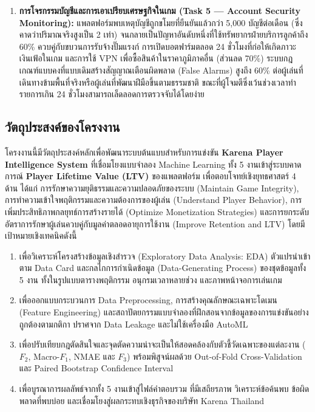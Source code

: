 \documentclass[11pt,a4paper]{article}
\DeclareRobustCommand{\code}[1]{\leavevmode{\ttfamily\color{KeyGreen!85!black}\let\codeunderscore\_\def\_{\codeunderscore\allowbreak}\hyphenpenalty=50\exhyphenpenalty=50\relax#1}}
\begin{document}
\begin{enumerate}[leftmargin=1.9em,itemsep=2.5pt]
    \item \textbf{การโจรกรรมบัญชีและการเอาเปรียบเศรษฐกิจในเกม (Task 5 — Account Security Monitoring):} แพลตฟอร์มพบเหตุบัญชีถูกขโมยที่ยืนยันแล้วกว่า 5,000 บัญชีต่อเดือน (ซึ่งคาดว่าปริมาณจริงสูงเป็น 2 เท่า) จนกลายเป็นปัญหาอันดับหนึ่งที่ใช้ทรัพยากรฝ่ายบริการลูกค้าถึง 60\% ควบคู่กับขบวนการรับจ้างปั๊มแรงก์ การเปิดบอตฟาร์มตลอด 24 ชั่วโมงที่ก่อให้เกิดภาวะเงินเฟ้อในเกม และการใช้ VPN เพื่อซื้อสินค้าในราคาภูมิภาคอื่น (ส่วนลด 70\%) ระบบกฎเกณฑ์แบบคงที่แบบเดิมสร้างสัญญาณเตือนผิดพลาด (False Alarms) สูงถึง 60\% ต่อผู้เล่นที่เดินทางข้ามพื้นที่จริงหรือผู้เล่นที่พัฒนาฝีมือขึ้นตามธรรมชาติ ขณะที่ผู้โจมตีซึ่งเว้นช่วงเวลาทำรายการเกิน 24 ชั่วโมงสามารถเล็ดลอดการตรวจจับได้โดยง่าย
\end{enumerate}

\subsection{วัตถุประสงค์ของโครงงาน}

โครงงานนี้มีวัตถุประสงค์หลักเพื่อพัฒนาระบบต้นแบบสำหรับการแข่งขัน \textbf{Karena Player Intelligence System} ที่เชื่อมโยงแบบจำลอง Machine Learning ทั้ง 5 งานเข้าสู่ระบบคาดการณ์ \textbf{Player Lifetime Value (LTV)} ของแพลตฟอร์ม เพื่อตอบโจทย์เชิงยุทธศาสตร์ 4 ด้าน ได้แก่ การรักษาความยุติธรรมและความปลอดภัยของระบบ (Maintain Game Integrity), การทำความเข้าใจพฤติกรรมและความต้องการของผู้เล่น (Understand Player Behavior), การเพิ่มประสิทธิภาพกลยุทธ์การสร้างรายได้ (Optimize Monetization Strategies) และการยกระดับอัตราการรักษาผู้เล่นควบคู่กับมูลค่าตลอดอายุการใช้งาน (Improve Retention and LTV) โดยมีเป้าหมายเชิงเทคนิคดังนี้

\begin{enumerate}[leftmargin=1.8em,itemsep=2pt]
    \item เพื่อวิเคราะห์โครงสร้างข้อมูลเชิงสำรวจ (Exploratory Data Analysis: EDA) ตัวแปรนำเข้าตาม Data Card และกลไกการกำเนิดข้อมูล (Data-Generating Process) ของชุดข้อมูลทั้ง 5 งาน ทั้งในรูปแบบตารางพฤติกรรม อนุกรมเวลาหลายช่วง และภาพหน้าจอการเล่นเกม
    \item เพื่อออกแบบกระบวนการ Data Preprocessing, การสร้างคุณลักษณะเฉพาะโดเมน (Feature Engineering) และสถาปัตยกรรมแบบจำลองที่ฝึกสอนจากข้อมูลของการแข่งขันอย่างถูกต้องตามกติกา ปราศจาก Data Leakage และไม่ใช้เครื่องมือ AutoML
    \item เพื่อปรับเทียบกฎตัดสินใจและจุดตัดความน่าจะเป็นให้สอดคล้องกับตัวชี้วัดเฉพาะของแต่ละงาน ($F_2$, Macro-$F_1$, NMAE และ $F_3$) พร้อมพิสูจน์ผลด้วย Out-of-Fold Cross-Validation และ Paired Bootstrap Confidence Interval
    \item เพื่อบูรณาการผลลัพธ์จากทั้ง 5 งานเข้าสู่ไฟล์คำตอบรวม \code{submission.csv} ที่มีเสถียรภาพ วิเคราะห์ข้อค้นพบ ข้อผิดพลาดที่พบบ่อย และเชื่อมโยงสู่ผลกระทบเชิงธุรกิจของบริษัท Karena Thailand
\end{enumerate}
\end{document}
